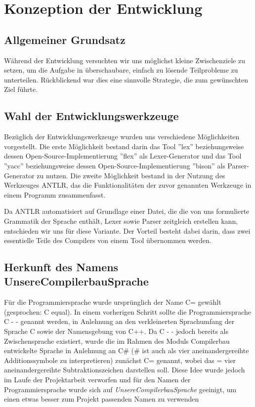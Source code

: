 
\section{Konzeption der Entwicklung}
\subsection{Allgemeiner Grundsatz}
\label{sec:grundsatz}
Während der Entwicklung versuchten wir uns möglichst kleine Zwischenziele zu setzen, um die Aufgabe in überschaubare, einfach zu lösende Teilprobleme zu unterteilen. Rückblickend war dies eine sinnvolle Strategie, die zum gewünschten Ziel führte.


\subsection{Wahl der Entwicklungswerkzeuge}
Bezüglich der Entwicklungswerkzeuge wurden uns verschiedene Möglichkeiten vorgestellt. Die erste Möglichkeit bestand darin das Tool ''lex'' beziehungsweise dessen Open-Source-Implementierung ''flex'' als Lexer-Generator und das Tool ''yacc'' beziehungsweise dessen Open-Source-Implementierung ''bison'' als Parser-Generator zu nutzen. Die zweite Möglichkeit bestand in der Nutzung des Werkzeuges ANTLR, das die Funktionalitäten der zuvor genannten Werkzeuge in einem Programm zusammenfasst.

Da ANTLR automatisiert auf Grundlage einer Datei, die die von uns formulierte Grammatik der Sprache enthält, Lexer sowie Parser zeitgleich erstellen kann, entschieden wir uns für diese Variante. Der Vorteil besteht dabei darin, dass zwei essentielle Teile des Compilers von einem Tool übernommen werden. 

\subsection{Herkunft des Namens UnsereCompilerbauSprache}
Für die Programmiersprache wurde ursprünglich der Name C= gewählt (gesprochen: C equal). In einem vorherigen Schritt sollte die Programmiersprache C - - genannt werden, in Anlehnung an den verkleinerten Sprachumfang der Sprache C sowie der Namensgebung von C++. Da C - - jedoch bereits als Zwischensprache existiert, wurde die im Rahmen des Moduls Compilerbau entwickelte Sprache in Anlehnung an C\# (\# ist auch als vier aneinandergereihte Additionssymbole zu interpretieren) zunächst C= genannt, wobei das = vier aneinandergereihte Subtraktionszeichen darstellen soll. Diese Idee wurde jedoch im Laufe der Projektarbeit verworfen und für den Namen der Programmiersprache wurde sich auf \textit{UnsereCompilerbauSprache} geeinigt, um einen etwas besser zum Projekt passenden Namen zu verwenden

